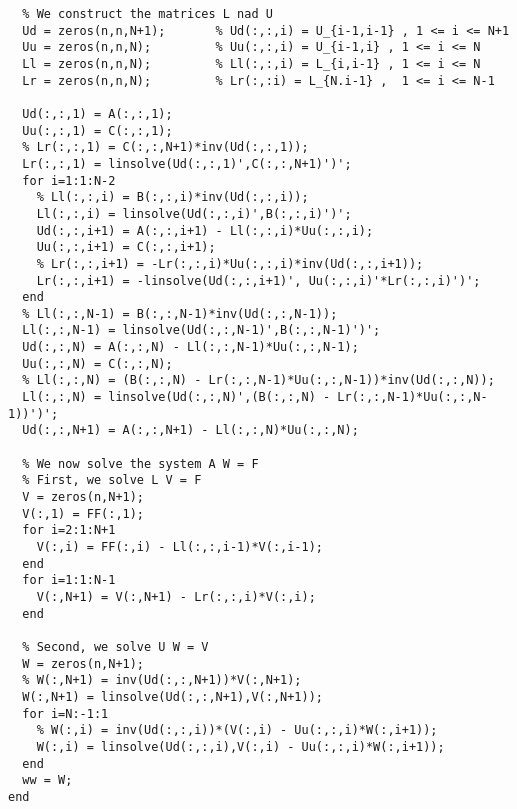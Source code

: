 \begin{code}
\begin{verbatim}
  % We construct the matrices L nad U
  Ud = zeros(n,n,N+1);       % Ud(:,:,i) = U_{i-1,i-1} , 1 <= i <= N+1
  Uu = zeros(n,n,N);         % Uu(:,:,i) = U_{i-1,i} , 1 <= i <= N
  Ll = zeros(n,n,N);         % Ll(:,:,i) = L_{i,i-1} , 1 <= i <= N
  Lr = zeros(n,n,N);         % Lr(:,:i) = L_{N.i-1} ,  1 <= i <= N-1

  Ud(:,:,1) = A(:,:,1);
  Uu(:,:,1) = C(:,:,1);
  % Lr(:,:,1) = C(:,:,N+1)*inv(Ud(:,:,1));
  Lr(:,:,1) = linsolve(Ud(:,:,1)',C(:,:,N+1)')';
  for i=1:1:N-2
    % Ll(:,:,i) = B(:,:,i)*inv(Ud(:,:,i));
    Ll(:,:,i) = linsolve(Ud(:,:,i)',B(:,:,i)')';
    Ud(:,:,i+1) = A(:,:,i+1) - Ll(:,:,i)*Uu(:,:,i);
    Uu(:,:,i+1) = C(:,:,i+1);
    % Lr(:,:,i+1) = -Lr(:,:,i)*Uu(:,:,i)*inv(Ud(:,:,i+1));
    Lr(:,:,i+1) = -linsolve(Ud(:,:,i+1)', Uu(:,:,i)'*Lr(:,:,i)')';
  end
  % Ll(:,:,N-1) = B(:,:,N-1)*inv(Ud(:,:,N-1));
  Ll(:,:,N-1) = linsolve(Ud(:,:,N-1)',B(:,:,N-1)')';
  Ud(:,:,N) = A(:,:,N) - Ll(:,:,N-1)*Uu(:,:,N-1);
  Uu(:,:,N) = C(:,:,N);
  % Ll(:,:,N) = (B(:,:,N) - Lr(:,:,N-1)*Uu(:,:,N-1))*inv(Ud(:,:,N));
  Ll(:,:,N) = linsolve(Ud(:,:,N)',(B(:,:,N) - Lr(:,:,N-1)*Uu(:,:,N-1))')';
  Ud(:,:,N+1) = A(:,:,N+1) - Ll(:,:,N)*Uu(:,:,N);

  % We now solve the system A W = F
  % First, we solve L V = F
  V = zeros(n,N+1);
  V(:,1) = FF(:,1);
  for i=2:1:N+1
    V(:,i) = FF(:,i) - Ll(:,:,i-1)*V(:,i-1);
  end
  for i=1:1:N-1
    V(:,N+1) = V(:,N+1) - Lr(:,:,i)*V(:,i);
  end
    
  % Second, we solve U W = V
  W = zeros(n,N+1);
  % W(:,N+1) = inv(Ud(:,:,N+1))*V(:,N+1);
  W(:,N+1) = linsolve(Ud(:,:,N+1),V(:,N+1));
  for i=N:-1:1
    % W(:,i) = inv(Ud(:,:,i))*(V(:,i) - Uu(:,:,i)*W(:,i+1));
    W(:,i) = linsolve(Ud(:,:,i),V(:,i) - Uu(:,:,i)*W(:,i+1));
  end
  ww = W;
end
\end{verbatim}
\end{code}


